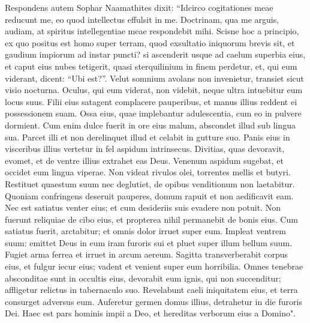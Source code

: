 \begin{biblechapter}  
\verse Respondens autem Sophar Naamathites dixit: 
\verse “Idcirco cogitationes meae reducunt me, eo quod intellectus effulsit in me. 
\verse Doctrinam, qua me arguis, audiam, at spiritus intellegentiae meae respondebit mihi. 
\verse Scisne hoc a principio, ex quo positus est homo super terram, 
\verse quod exsultatio iniquorum brevis sit, et gaudium impiorum ad instar puncti? 
\verse si ascenderit usque ad caelum superbia eius, et caput eius nubes tetigerit, 
\verse quasi sterquilinium in finem perdetur, et, qui eum viderant, dicent: “Ubi est?”. 
\verse Velut somnium avolans non invenietur, transiet sicut visio nocturna. 
\verse Oculus, qui eum viderat, non videbit, neque ultra intuebitur eum locus suus. 
\verse Filii eius satagent complacere pauperibus, et manus illius reddent ei possessionem suam. 
\verse Ossa eius, quae implebantur adulescentia, cum eo in pulvere dormient. 
\verse Cum enim dulce fuerit in ore eius malum, abscondet illud sub lingua sua. 
\verse Parcet illi et non derelinquet illud et celabit in gutture suo. 
\verse Panis eius in visceribus illius vertetur in fel aspidum intrinsecus. 
\verse Divitias, quas devoravit, evomet, et de ventre illius extrahet eas Deus. 
\verse Venenum aspidum sugebat, et occidet eum lingua viperae. 
\verse Non videat rivulos olei, torrentes mellis et butyri. 
\verse Restituet quaestum suum nec deglutiet, de opibus venditionum non laetabitur. 
\verse Quoniam confringens deseruit pauperes, domum rapuit et non aedificavit eam. 
\verse Nec est satiatus venter eius; et cum desideriis suis evadere non potuit. 
\verse Non fuerunt reliquiae de cibo eius, et propterea nihil permanebit de bonis eius. 
\verse Cum satiatus fuerit, arctabitur; et omnis dolor irruet super eum. 
\verse Impleat ventrem suum: emittet Deus in eum iram furoris sui et pluet super illum bellum suum. 
\verse Fugiet arma ferrea et irruet in arcum aereum. 
\verse Sagitta transverberabit corpus eius, et fulgur iecur eius; vadent et venient super eum horribilia. 
\verse Omnes tenebrae absconditae sunt in occultis eius, devorabit eum ignis, qui non succenditur; affligetur relictus in tabernaculo suo. 
\verse Revelabunt caeli iniquitatem eius, et terra consurget adversus eum. 
\verse Auferetur germen domus illius, detrahetur in die furoris Dei. 
\verse Haec est pars hominis impii a Deo, et hereditas verborum eius a Domino". 
\end{biblechapter}

